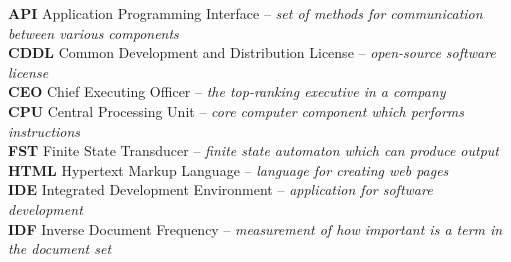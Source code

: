 \documentclass[12pt,a4paper]{report}
\begin{document}



\tableofcontents












\listoffigures

\listoftables


\textbf{API} Application Programming Interface – \textit{set of methods for communication between various components}
\\

\textbf{CDDL} Common Development and Distribution License – \textit{open-source software license}
\\

\textbf{CEO} Chief Executing Officer – \textit{the top-ranking executive in a company}
\\

\textbf{CPU} Central Processing Unit – \textit{core computer component which performs instructions}
\\

\textbf{FST} Finite State Transducer – \textit{finite state automaton which can produce output}
\\

\textbf{HTML} Hypertext Markup Language – \textit{language for creating web pages}
\\

\textbf{IDE} Integrated Development Environment – \textit{application for software development}
\\

\textbf{IDF} Inverse Document Frequency – \textit{measurement of how important is a term in the document set}
\\
\end{document}
